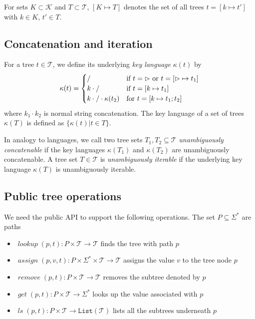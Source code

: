 \documentclass[12pt,fleqn]{amsart}
\newcommand{\ensmath}[1]{\ensuremath{#1}\xspace}
\newcommand{\opnam}[1]{\ensmath{\operatorname{\mathit{#1}}}}
\newcommand{\tree}[1]{\ensmath{[#1]}}
\newcommand{\conc}[2]{\ensmath{#1\cdot #2}}
\newcommand{\Trees}{\ensmath{\mathcal T}}
\newcommand{\tmap}[2]{\ensmath{#1\mapsto #2}}
\newcommand{\List}[1]{\ensmath{\mathtt{List(#1)}}}
\newcommand{\Keys}{\ensmath{\mathcal{K}}}
\newcommand{\key}[1]{\ensmath{\kappa(#1)}}
\newcommand{\lto}{\ensmath{\longrightarrow}}
\begin{document}
For sets $K\subset\Keys$ and $T\subset\Trees$, $\tree{\tmap{K}{T}}$
denotes the set of all trees $t = \tree{\tmap{k}{t'}}$ with $k\in K$, $t'
\in T$.

\subsection{Concatenation and iteration}
For a tree $t\in \Trees$, we define its underlying \emph{key language}
$\key{t}$ by
\begin{equation*}
  \key{t} = \begin{cases}
    {\tt /} & \text{if } t = \rhd \text{ or } t = \tree{\tmap{\rhd}{t_1}}\\
    k \cdot {\mathtt /} & \text{if } t = \tree{\tmap{k}{t_1}}\\
    k\cdot {\mathtt /}\cdot \key{t_2} & \text{for } t = \tree{\tmap{k}{t_1};t_2}
  \end{cases}
\end{equation*}
where $\conc{k_1}{k_2}$ is normal string concatenation. The key language of
a set of trees $\key{T}$ is defined as $\{\key{t} | t \in T\}$.

In analogy to languages, we call two tree sets $T_1, T_2 \subseteq \Trees$
\emph{unambiguously concatenable} if the key languages $\key{T_1}$ and
$\key{T_2}$ are unambiguously concatenable. A tree set $T\in\Trees$ is
\emph{unambiguously iterable} if the underlying key language $\key{T}$ is
unambiguously iterable.

\subsection{Public tree operations}
We need the public API to support the following operations. The set
$P\subseteq \Sigma^*$ are paths

\begin{itemize}
  \item $\opnam{lookup}(p, t): P \times \Trees \lto \Trees$ finds the tree
    with path $p$
  \item $\opnam{assign}(p, v, t): P \times \Sigma^* \times \Trees \lto
    \Trees$ assigns the value $v$ to the tree node $p$
  \item $\opnam{remove}(p, t): P \times \Trees \lto \Trees$ removes the
    subtree denoted by $p$
  \item $\opnam{get}(p, t): P \times \Trees \lto \Sigma^*$ looks up the
    value associated with $p$
    \item $\opnam{ls}(p, t): P \times \Trees \lto \List{\Trees}$ lists all
      the subtrees underneath $p$
\end{itemize}
\end{document}
